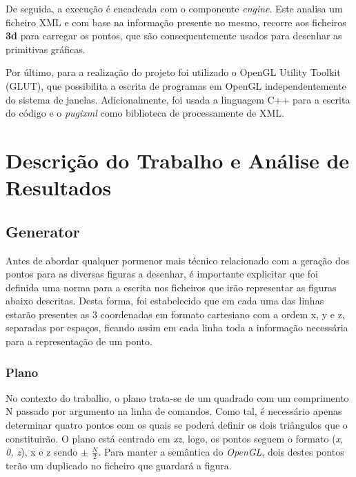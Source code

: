 \documentclass[a4paper]{article}
\begin{document}
\hspace{3mm} De seguida, a execução é encadeada com o componente \textit{engine}. Este analisa um ficheiro XML e com base na informação presente no mesmo, recorre aos ficheiros \textbf{3d} para carregar os pontos, que são consequentemente usados para desenhar as primitivas gráficas.

\hspace{3mm} Por último, para a realização do projeto foi utilizado o OpenGL Utility Toolkit (GLUT), que possibilita a escrita de programas em OpenGL independentemente do sistema de janelas. Adicionalmente, foi usada a linguagem C++ para a escrita do código e o \textit{pugixml} como biblioteca de processamente de XML.


\section{Descrição do Trabalho e Análise de Resultados}

\subsection{Generator}

\hspace{8mm} Antes de abordar qualquer pormenor mais técnico relacionado com a geração dos pontos para as diversas figuras a desenhar, é importante explicitar que foi definida uma norma para a escrita nos ficheiros que irão representar as figuras abaixo descritas. Desta forma, foi estabelecido que em cada uma das linhas estarão presentes as 3 coordenadas em formato cartesiano com a ordem x, y e z, separadas por espaços, ficando assim em cada linha toda a informação necessária para a representação de um ponto.

\subsubsection{Plano} %

\hspace{8mm} No contexto do trabalho, o plano trata-se de um quadrado com um comprimento N passado por argumento na linha de comandos. Como tal, é necessário apenas determinar quatro pontos com os quais se poderá definir os dois triângulos que o constituirão. O plano está centrado em \emph{xz}, logo, os pontos seguem o formato (\emph{x, 0, z}), x e z sendo $\pm$ \( \frac{N}{2} \). Para manter a semântica do \emph{OpenGL}, dois destes pontos terão um duplicado no ficheiro que guardará a figura.
\end{document}
